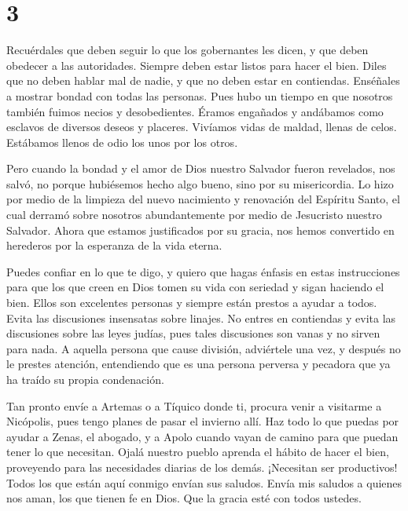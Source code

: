 \hypertarget{section-2}{%
\section{3}\label{section-2}}

 Recuérdales que deben seguir lo que los gobernantes les
dicen, y que deben obedecer a las autoridades. Siempre deben estar
listos para hacer el bien.  Diles que no deben hablar mal de
nadie, y que no deben estar en contiendas. Enséñales a mostrar bondad
con todas las personas.  Pues hubo un tiempo en que nosotros
también fuimos necios y desobedientes. Éramos engañados y andábamos como
esclavos de diversos deseos y placeres. Vivíamos vidas de maldad, llenas
de celos. Estábamos llenos de odio los unos por los otros.

 Pero cuando la bondad y el amor de Dios nuestro Salvador
fueron revelados, nos salvó,  no porque hubiésemos hecho
algo bueno, sino por su misericordia. Lo hizo por medio de la limpieza
del nuevo nacimiento y renovación del Espíritu Santo,  el
cual derramó sobre nosotros abundantemente por medio de Jesucristo
nuestro Salvador.  Ahora que estamos justificados por su
gracia, nos hemos convertido en herederos por la esperanza de la vida
eterna.

 Puedes confiar en lo que te digo, y quiero que hagas
énfasis en estas instrucciones para que los que creen en Dios tomen su
vida con seriedad y sigan haciendo el bien. Ellos son excelentes
personas y siempre están prestos a ayudar a todos.  Evita
las discusiones insensatas sobre linajes. No entres en contiendas y
evita las discusiones sobre las leyes judías, pues tales discusiones son
vanas y no sirven para nada.  A aquella persona que cause
división, adviértele una vez, y después no le prestes atención,
 entendiendo que es una persona perversa y pecadora que ya
ha traído su propia condenación.

 Tan pronto envíe a Artemas o a Tíquico donde ti, procura
venir a visitarme a Nicópolis, pues tengo planes de pasar el invierno
allí.  Haz todo lo que puedas por ayudar a Zenas, el
abogado, y a Apolo cuando vayan de camino para que puedan tener lo que
necesitan.  Ojalá nuestro pueblo aprenda el hábito de hacer
el bien, proveyendo para las necesidades diarias de los demás.
¡Necesitan ser productivos!  Todos los que están aquí
conmigo envían sus saludos. Envía mis saludos a quienes nos aman, los
que tienen fe en Dios. Que la gracia esté con todos ustedes.
